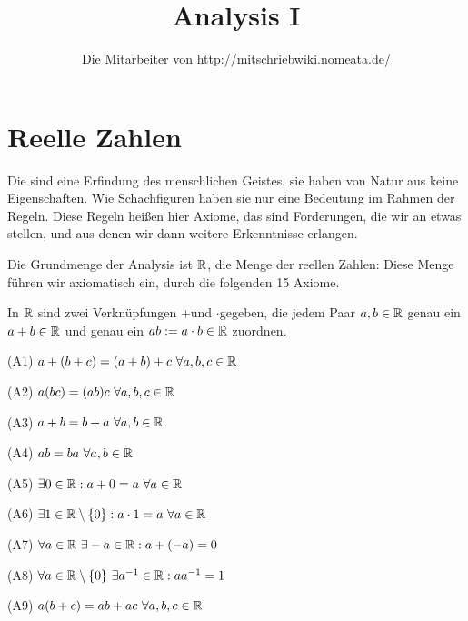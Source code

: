 \documentclass[a4paper,twoside,DIV15,BCOR12mm]{scrbook}
\author{Die Mitarbeiter von \url{http://mitschriebwiki.nomeata.de/}}
\title{Analysis I}
\begin{document}
\maketitle

\renewcommand{\thechapter}{\Roman{chapter}}
\tableofcontents




\renewcommand{\thechapter}{\arabic{chapter}}
\renewcommand{\chaptername}{§}
\setcounter{chapter}{0}

\chapter{Reelle Zahlen}

Die  sind eine Erfindung des menschlichen Geistes, sie haben von Natur aus keine Eigenschaften. Wie Schachfiguren haben sie nur eine Bedeutung im Rahmen der Regeln. Diese Regeln heißen hier Axiome, das sind Forderungen, die wir an etwas stellen, und aus denen wir dann weitere Erkenntnisse erlangen.

Die Grundmenge der Analysis ist $\mathbb{R}$, die Menge der reellen Zahlen: Diese Menge führen wir axiomatisch ein, durch die folgenden 15 Axiome.

In $\mathbb{R}$ sind zwei Verknüpfungen \glqq +\grqq und \glqq $\cdot$\grqq gegeben, die jedem Paar $a,b \in \mathbb{R}$ genau ein $ a+b \in \mathbb{R}$ und genau ein $ ab := a \cdot b \in \mathbb{R}$ zuordnen.

\begin{axiom}[K"orperaxiome]
\begin{liste}
\item[(A1)] $a+(b+c) = (a+b)+c \ \forall a,b,c \in \MdR$
\item[(A2)] $a(bc) = (ab)c \ \forall a,b,c \in \mathbb{R}$
\item[(A3)] $a+b = b+a \ \forall a,b \in \mathbb{R}$
\item[(A4)] $ab = ba \ \forall a,b \in \mathbb{R}$
\item[(A5)] $\exists 0 \in \mathbb{R}: a + 0 = a \ \forall a \in \mathbb{R}$
\item[(A6)] $\exists 1 \in \mathbb{R}\setminus\{0\}: a \cdot 1 = a \ \forall a \in \mathbb{R}$
\item[(A7)] $\forall a \in \MdR\ \exists -a \in \MdR: a + (-a) = 0 $
\item[(A8)] $\forall a \in \mathbb{R} \setminus \{0\}\ \exists a^{-1} \in \mathbb{R}: a a^{-1} = 1 $
\item[(A9)] $a(b+c) = ab + ac \ \forall a,b,c \in \MdR$
\end{liste}
\end{axiom}
\end{document}
